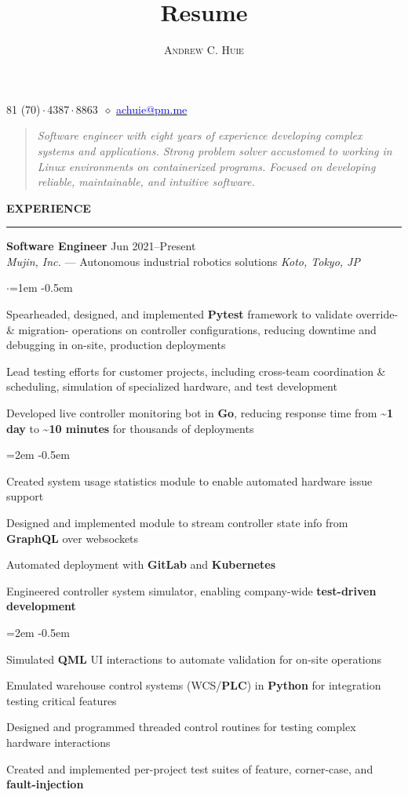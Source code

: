 \documentclass[10pt, a4paper]{article}
\makeatletter
\newenvironment{aSection}[1]{
    \medskip \textbf{\uppercase{#1}}
    \smallskip
    \hrule
    \begin{list}{}{
            \setlength{\leftmargin}{1.5em}
        }
    \item[]
    }{
    \end{list}
}
\newenvironment{expSubsection}[4]{
    \textbf{#3} \hfill {#2} \\
    {#1} \hfill \textit{#4}
    \smallskip
    \begin{list}{$\cdot$}{\leftmargin=1em}
    \itemsep -0.5em \vspace{-0.5em}
    }{
    \end{list}
    \vspace{0.5em}
}
\newenvironment{subList}{
    \begin{list}{\raisebox{.4ex}{\tiny$\succ$}}{\leftmargin=2em}
    \itemsep -0.5em \vspace{-0.5em}
    }{
    \end{list}
}
\renewcommand{\maketitle}{
    \begin{center}
        {\Huge\theauthor}

        \vspace{0.25em}

        \raisebox{.3ex}{\footnotesize+}81 (70)\,$\cdot$\,4387\,$\cdot$\,8863~$\diamond$
        \href{mailto:achuie@pm.me}{\textcolor{blue}{
            achuie@pm.me
        }}
    \end{center}

    \vspace{1em}

    \begingroup
    \addtolength\leftmargini{1.5em}
    \begin{quote}
        \textit{Software engineer with eight years of experience developing complex systems and applications. Strong
            problem solver accustomed to working in Linux environments on containerized programs. Focused on developing
            reliable, maintainable, and intuitive software.}
    \end{quote}
    \endgroup
}
\makeatother
\begin{document}
\title{Resume}
\author{\textsc{Andrew C. Huie}}

\maketitle

\begin{aSection}{Experience}
    \begin{expSubsection}
        {\textit{Mujin, Inc.} --- Autonomous industrial robotics solutions}
        {Jun 2021--Present}
        {Software Engineer}
        {Koto, Tokyo, JP}
    \item Spearheaded, designed, and implemented \textbf{Pytest} framework to validate override- \& migration-
        operations on controller configurations, reducing downtime and debugging in on-site, production deployments
    \item Lead testing efforts for customer projects, including cross-team coordination \& scheduling, simulation of
        specialized hardware, and test development
    \item Developed live controller monitoring bot in \textbf{Go}, reducing response time from \textbf{\textasciitilde 1
        day} to \textbf{\textasciitilde 10 minutes} for thousands of deployments
        \begin{subList}
        \item Created system usage statistics module to enable automated hardware issue support
        \item Designed and implemented module to stream controller state info from \textbf{GraphQL} over websockets
        \item Automated deployment with \textbf{GitLab} and \textbf{Kubernetes}
        \end{subList}
    \item Engineered controller system simulator, enabling company-wide \textbf{test-driven development}
        \begin{subList}
        \item Simulated \textbf{QML} UI interactions to automate validation for on-site operations
        \item Emulated warehouse control systems (WCS/\textbf{PLC}) in \textbf{Python} for integration testing critical
            features
        \item Designed and programmed threaded control routines for testing complex hardware interactions
        \item Created and implemented per-project test suites of feature, corner-case, and \textbf{fault-injection}

\end{subList}
\end{expSubsection}
\end{aSection}
\end{document}
